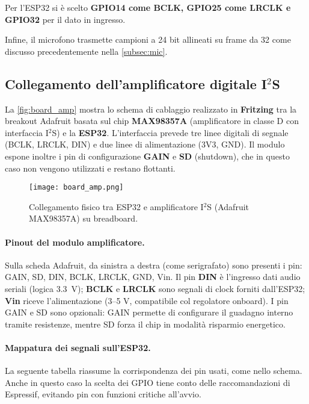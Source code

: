   Per l’ESP32 si è scelto \textbf{GPIO14 come BCLK, GPIO25 come LRCLK e GPIO32} per il dato in ingresso.
    
  Infine, il microfono trasmette campioni a 24 bit allineati su frame da 32 come discusso precedentemente nella \autoref{subsec:mic}.
  
 
\subsection{Collegamento dell’amplificatore digitale I$^2$S}
\label{subsec:conn_amp}

La \autoref{fig:board_amp} mostra lo schema di cablaggio realizzato in \textbf{Fritzing} tra la breakout Adafruit basata sul chip \textbf{MAX98357A}
 (amplificatore in classe D con interfaccia I$^2$S) e la \textbf{ESP32}.  
L’interfaccia prevede tre linee digitali di segnale
(BCLK, LRCLK, DIN) e due linee di alimentazione (3V3, GND). Il modulo espone inoltre i pin di configurazione \textbf{GAIN} e \textbf{SD} (shutdown), 
che in questo caso non vengono utilizzati e restano flottanti.

\begin{figure}[H]
  \centering
  \texttt{[image: board\_amp.png]}
  \caption{Collegamento fisico tra ESP32 e amplificatore I$^2$S (Adafruit MAX98357A) su breadboard.}
  \label{fig:board_amp}
\end{figure} 

\paragraph{Pinout del modulo amplificatore.}
Sulla scheda Adafruit, da sinistra a destra (come serigrafato) sono presenti i pin: GAIN, SD, DIN, BCLK, LRCLK, GND, Vin.  
Il pin \textbf{DIN} è l’ingresso dati audio seriali (logica \SI{3.3}{\volt}); \textbf{BCLK} e \textbf{LRCLK} sono segnali di clock forniti dall’ESP32; \textbf{Vin} riceve l’alimentazione (3–5 V, compatibile col regolatore onboard).  
I pin GAIN e SD sono opzionali: GAIN permette di configurare il guadagno interno tramite resistenze, mentre SD forza il chip in modalità risparmio energetico.

\paragraph{Mappatura dei segnali sull'ESP32.}
La seguente tabella riassume la corrispondenza dei pin usati, come nello schema. Anche in questo caso la scelta dei GPIO tiene conto delle raccomandazioni di Espressif, evitando pin con funzioni critiche all’avvio.


